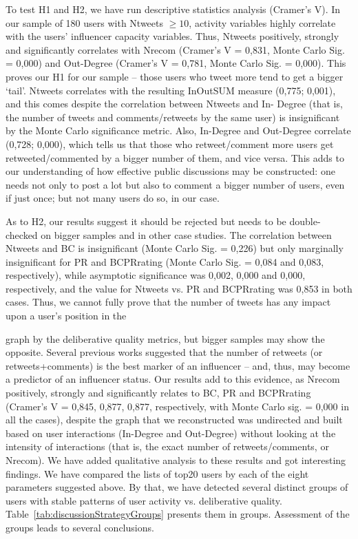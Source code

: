 To test H1 and H2, we have run descriptive statistics analysis (Cramer's V). In our sample of 180 users with Ntweets \(\ge 10\), activity variables highly correlate with the users’ influencer capacity variables. Thus, Ntweets positively, strongly and significantly correlates with Nrecom (Cramer’s V = 0,831, Monte Carlo Sig. = 0,000) and Out-Degree (Cramer’s V = 0,781, Monte Carlo Sig. = 0,000). This proves our H1 for our sample – those users who tweet more tend to get a bigger ‘tail’. Ntweets correlates with the resulting InOutSUM measure (0,775; 0,001), and this comes despite the correlation between Ntweets and In- Degree (that is, the number of tweets and comments/retweets by the same user) is insignificant by the Monte Carlo significance metric. Also, In-Degree and Out-Degree correlate (0,728; 0,000), which tells us that those who retweet/comment more users get retweeted/commented by a bigger number of them, and vice versa. This adds to our understanding of how effective public discussions may be constructed: one needs not only to post a lot but also to comment a bigger number of users, even if just once; but not many users do so, in our case.

As to H2, our results suggest it should be rejected but needs to be double-checked on bigger samples and in other case studies. The correlation between Ntweets and BC is insignificant (Monte Carlo Sig. = 0,226) but only marginally insignificant for PR and BCPRrating (Monte Carlo Sig. = 0,084 and 0,083, respectively), while asymptotic significance was 0,002, 0,000 and 0,000, respectively, and the value for Ntweets vs. PR and BCPRrating was 0,853 in both cases. Thus, we cannot fully prove that the number of tweets has any impact upon a user’s position in the

graph by the deliberative quality metrics, but bigger samples may show the opposite.
Several previous works suggested that the number of retweets (or retweets+comments) is the best marker of an influencer – and, thus, may become a predictor of an influencer status. Our results add to this evidence, as Nrecom positively, strongly and significantly relates to BC, PR and BCPRrating (Cramer’s V = 0,845, 0,877, 0,877, respectively, with Monte Carlo sig. = 0,000 in all the cases), despite the graph that we reconstructed was undirected and built based on user interactions (In-Degree and Out-Degree) without looking at the intensity of interactions (that is, the exact number of retweets/comments, or Nrecom).
We have added qualitative analysis to these results and got interesting findings. We have compared the lists of top20 users by each of the eight parameters suggested above. By that, we have detected several distinct groups of users with stable patterns of user activity vs. deliberative quality. Table~\cref{tab:discussionStrategyGroups} presents them in groups. Assessment of the groups leads to several conclusions.

